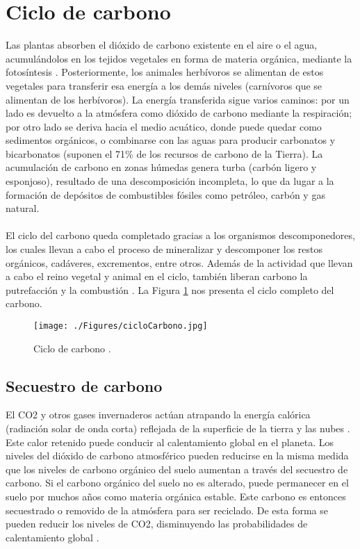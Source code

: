 \section{Ciclo de carbono} 
Las plantas absorben el dióxido de carbono existente en el aire o el agua, acumul\'andolos en los tejidos vegetales en forma de materia org\'anica, mediante la fotos\'intesis \cite{natur2015PW}. Posteriormente, los animales herb\'ivoros se alimentan de estos vegetales para transferir esa energ\'ia a los dem\'as niveles (carnívoros que se alimentan de los herb\'ivoros).
La energía transferida sigue varios caminos: por un lado es devuelto a la atm\'osfera como di\'oxido de carbono mediante la respiraci\'on; por otro lado se deriva hacia el medio acu\'atico, donde puede quedar como sedimentos org\'anicos, o combinarse con las aguas para producir carbonatos y bicarbonatos (suponen el 71\% de los recursos de carbono de la Tierra). La acumulaci\'on de carbono en zonas h\'umedas genera turba (carb\'on ligero y esponjoso), resultado de una descomposición incompleta, lo que da lugar a la formaci\'on de dep\'ositos de combustibles f\'osiles como petr\'oleo, carb\'on y gas natural.\\~\\
El ciclo del carbono queda completado gracias a los organismos des\-componedores, los cuales llevan a cabo el proceso de mineralizar y descomponer los restos org\'anicos, cad\'averes, excrementos, entre otros. Adem\'as de la actividad que llevan a cabo el reino vegetal y animal en el ciclo, tambi\'en liberan carbono la putrefacci\'on y la combusti\'on \cite{natur2015PW}. La Figura \ref{fig:ciclocarbono} nos presenta el ciclo completo del carbono.
    \begin{figure}[!hbtp]
    	\centering
    	\texttt{[image: ./Figures/cicloCarbono.jpg]}
    	\caption{Ciclo de carbono \cite{ciclot2015carbo}.}
    	\label{fig:ciclocarbono}
    \end{figure}


\subsection{Secuestro de carbono}
El CO2 y otros gases invernaderos actúan atrapando la energ\'ia cal\'orica (radiación solar de onda corta) reflejada de la superficie de la tierra y las nubes \cite{encaptura}. Este calor retenido puede conducir al calentamiento global en el planeta. Los niveles del di\'oxido de carbono atmosf\'erico pueden reducirse en la misma medida que los niveles de carbono org\'anico del suelo aumentan a trav\'es del secuestro de carbono. Si el carbono org\'anico del suelo no es alterado, puede permanecer en el suelo por muchos a\~{n}os como materia org\'anica estable. Este carbono es entonces secuestrado o removido de la atm\'osfera para ser reciclado. De esta forma se pueden reducir los niveles de CO2, disminuyendo las probabilidades de calentamiento global \cite{castillo2003manejo}.
